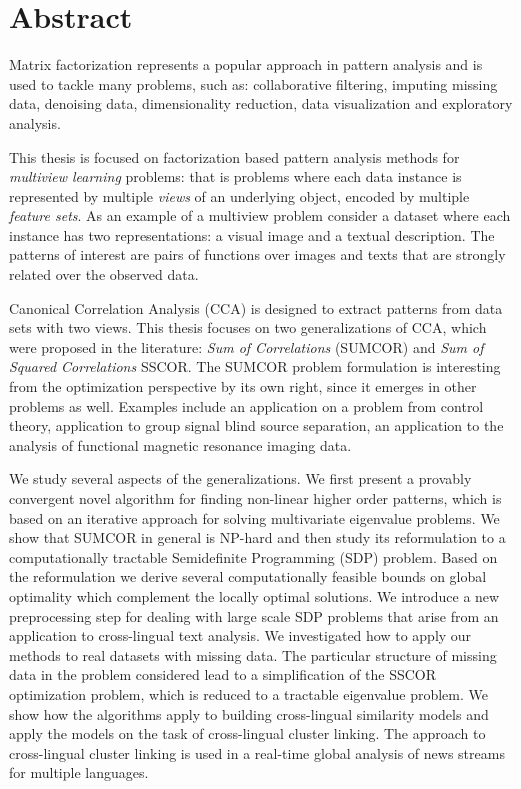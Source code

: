 %
\chapter*{Abstract}

Matrix factorization represents a popular approach in pattern analysis and
is used to tackle many problems, such as: collaborative filtering, imputing
missing data, denoising data, dimensionality reduction, data visualization and
exploratory analysis.

This thesis is focused on factorization based pattern analysis methods
for \emph{multiview learning} problems:
that is problems where each data instance is represented by multiple \emph{views} of an underlying
object, encoded by multiple \emph{feature sets}.
As an example of a multiview problem consider a dataset where each instance has two representations: a visual
image and a textual description. The patterns of interest are pairs of functions over images and texts
that are strongly related over the observed data.

Canonical Correlation Analysis (CCA) is designed to extract patterns from data sets
with two views. This thesis focuses on two generalizations of CCA, which were proposed
in the literature: \emph{Sum of Correlations} (SUMCOR) and \emph{Sum of Squared Correlations} SSCOR.
The SUMCOR problem formulation is interesting from the optimization perspective by its own right,
since it emerges in other problems as well. Examples include an application on a problem
from control theory, application to group signal blind source separation,
an application to the analysis of functional magnetic resonance imaging data.

We study several aspects of the generalizations. We first present a provably convergent novel algorithm
for finding non-linear higher order patterns, which is based on an iterative approach for solving
multivariate eigenvalue problems. We show that SUMCOR in general is NP-hard and then study
its reformulation to a computationally tractable Semidefinite Programming (SDP) problem. Based
on the reformulation we derive several computationally feasible bounds on global optimality
which complement the locally optimal solutions. We introduce a new preprocessing step
for dealing with large scale SDP problems that arise from an application to cross-lingual
text analysis. We investigated how to apply our methods to real datasets with missing data.
The particular structure of missing data in the problem considered lead to a simplification of the SSCOR
optimization problem, which is reduced to a tractable eigenvalue problem. We show how
the algorithms apply to building cross-lingual similarity models and apply the models on the task
of cross-lingual cluster linking. The approach to cross-lingual cluster linking is used
in a real-time global analysis of news streams for multiple languages. 